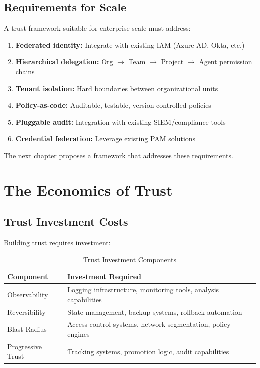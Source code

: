 \subsection{Requirements for Scale}
\label{subsec:scale-requirements}

A trust framework suitable for enterprise scale must address:

\begin{enumerate}
    \item \textbf{Federated identity:} Integrate with existing IAM (Azure AD, Okta, etc.)
    \item \textbf{Hierarchical delegation:} Org $\rightarrow$ Team $\rightarrow$ Project $\rightarrow$ Agent permission chains
    \item \textbf{Tenant isolation:} Hard boundaries between organizational units
    \item \textbf{Policy-as-code:} Auditable, testable, version-controlled policies
    \item \textbf{Pluggable audit:} Integration with existing SIEM/compliance tools
    \item \textbf{Credential federation:} Leverage existing PAM solutions
\end{enumerate}

The next chapter proposes a framework that addresses these requirements.

\section{The Economics of Trust}
\label{sec:economics-trust}

\subsection{Trust Investment Costs}
\label{subsec:trust-costs}

Building trust requires investment:

\begin{table}[htbp]
\centering
\caption{Trust Investment Components}
\label{tab:trust-investment}
\begin{tabular}{ll}
\toprule
\textbf{Component} & \textbf{Investment Required} \\
\midrule
Observability & Logging infrastructure, monitoring tools, analysis capabilities \\
Reversibility & State management, backup systems, rollback automation \\
Blast Radius & Access control systems, network segmentation, policy engines \\
Progressive Trust & Tracking systems, promotion logic, audit capabilities \\
\bottomrule
\end{tabular}
\end{table}

